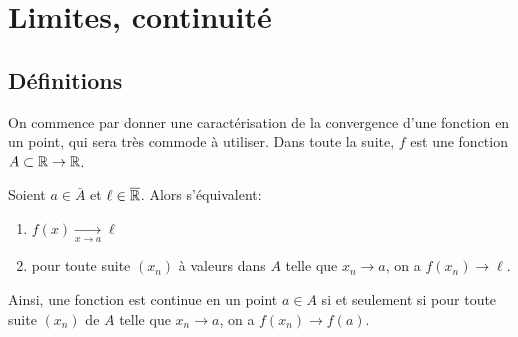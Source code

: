 \documentclass[../main.tex]{subfiles}
\begin{document}
\begin{comment}
\subsection{Densité d'une partie de $\R$}

\begin{mydef}[Densité]
    On dit que $A$ est dense dans $\R$ si pour tous réels $x$ et $y$ il existe un $a\in A\cap {]x,y[}$.
\end{mydef}

\begin{thm}[Propriété d'archimède]
    Soient $x<y$ deux réels avec $x>0$. Alors il existe $n\in\N$ tel que $y\leq nx$.
\end{thm}

\begin{prop}
    L'ensemble $\Q$ des nombres rationnels est dense dans $\R$.
\end{prop}

\begin{exo}[D]
    Le démontrer.
\end{exo}
\end{comment}

\section{Limites, continuité}

\subsection{Définitions}

On commence par donner une caractérisation de la convergence d'une fonction en un point, qui sera très commode à utiliser. Dans toute la suite, $f$ est une fonction $A\subset\mathbb R\rightarrow\mathbb R$.

\begin{prop}\label{caractCVfct}
    Soient $a\in\bar{A}$ et $\ell\in\overline{\mathbb R}$. Alors s'équivalent:
    \begin{enumerate}
        \item $f(x)\xrightarrow[x\to a]{}\ell$
        \item pour toute suite $(x_n)$ à valeurs dans $A$ telle que $x_n\longrightarrow a$, on a $f(x_n)\longrightarrow \ell$.
    \end{enumerate}
\end{prop}

Ainsi, une fonction est continue en un point $a\in A$ si et seulement si pour toute suite $(x_n)$ de $A$ telle que $x_n\longrightarrow a$, on a $f(x_n)\longrightarrow f(a)$.
\end{document}
